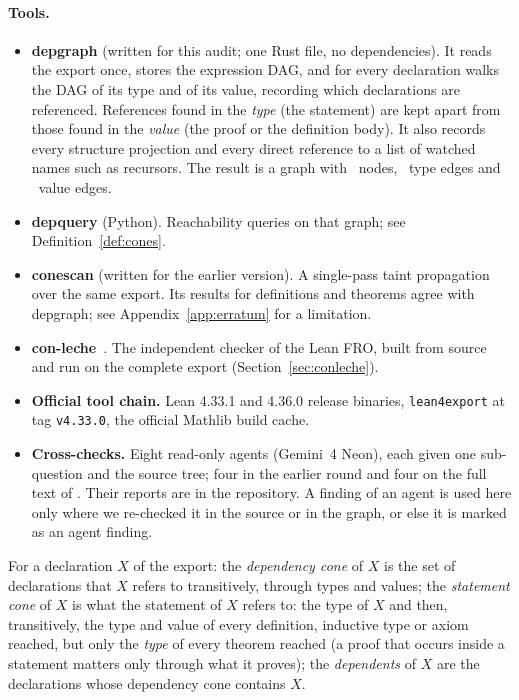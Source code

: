 \paragraph{Tools.}
\begin{itemize}
\item \textbf{depgraph} (written for this audit; one Rust file, no dependencies). It reads the export once, stores the expression DAG, and for every declaration walks the DAG of its type and of its value,
recording which declarations are referenced. References found in the \emph{type} (the statement) are kept apart from those found in the \emph{value} (the proof or the definition body).
It also records every structure projection and every direct reference to a list of watched names such as recursors. The result is a graph with \Ndecl\ nodes, \NedgesT\ type edges and \NedgesV\ value edges.
\item \textbf{depquery} (Python). Reachability queries on that graph; see Definition~\ref{def:cones}.
\item \textbf{conescan} (written for the earlier version). A single-pass taint propagation over the same export. Its results for definitions and theorems agree with depgraph; see Appendix~\ref{app:erratum} for a limitation.
\item \textbf{con-leche}~\cite{conleche}. The independent checker of the Lean FRO, built from source and run on the complete export (Section~\ref{sec:conleche}).
\item \textbf{Official tool chain.} Lean 4.33.1 and 4.36.0 release binaries, \texttt{lean4export} at tag \texttt{v4.33.0}, the official Mathlib build cache.
\item \textbf{Cross-checks.} Eight read-only agents (Gemini~4 Neon), each given one sub-question and the source tree; four in the earlier round and four on the full text of \N.
Their reports are in the repository. A finding of an agent is used here only where we re-checked it in the source or in the graph, or else it is marked as an agent finding.
\end{itemize}

\begin{definition}\label{def:cones}
For a declaration $X$ of the export:
the \emph{dependency cone} of $X$ is the set of declarations that $X$ refers to transitively, through types and values;
the \emph{statement cone} of $X$ is what the statement of $X$ refers to: the type of $X$ and then, transitively, the type and value of every definition, inductive type or axiom reached, but only the \emph{type} of every theorem reached
(a proof that occurs inside a statement matters only through what it proves);
the \emph{dependents} of $X$ are the declarations whose dependency cone contains $X$.
\end{definition}
